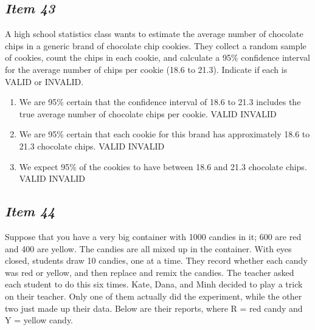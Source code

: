 \subsection{\textbf{\textit{Item 43}}}


A high school statistics class wants to estimate the average number of chocolate chips in a generic brand of chocolate chip cookies. They collect a random sample of cookies, count the chips in each cookie, and calculate a 95\% confidence interval for the average number of chips per cookie (18.6 to 21.3). Indicate if each is VALID or INVALID.




\begin{enumerate} [leftmargin=1cm, itemsep=.2em]


\item We are 95\% certain that the confidence interval of 18.6 to 21.3 includes the true average number of chocolate chips per cookie. VALID INVALID


\item We are 95\% certain that each cookie for this brand has approximately 18.6 to 21.3 chocolate chips. VALID INVALID


\item We expect 95\% of the cookies to have between 18.6 and 21.3 chocolate chips. VALID INVALID


\end{enumerate}





\subsection{\textbf{\textit{Item 44}}}


Suppose that you have a very big container with 1000 candies in it; 600 are red and 400 are yellow. The candies are all mixed up in the container. With eyes closed, students draw 10 candies, one at a time. They record whether each candy was red or yellow, and then replace and remix the candies. The teacher asked each student to do this six times. Kate, Dana, and Minh decided to play a trick on their teacher. Only one of them actually did the experiment, while the other two just made up their data. Below are their reports, where R = red candy and Y = yellow candy.


